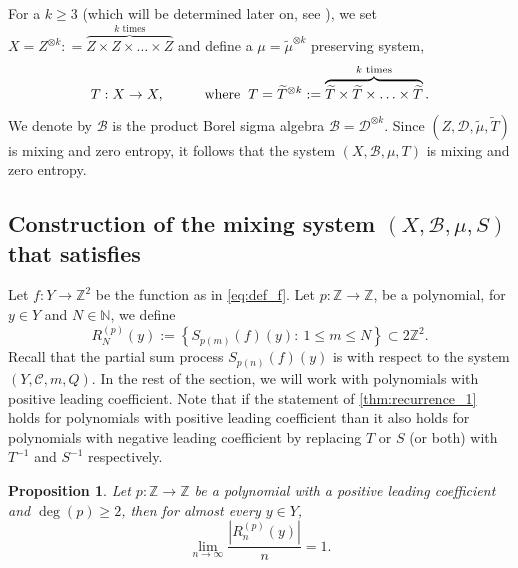 \documentclass[12pt,reqno]{amsart}
\newcommand{\N}{\mathbb{N}}
\newcommand{\Z}{\mathbb{Z}}
\newcommand{\B}{\mathcal{B}}
\newcommand{\TT}{\widetilde{T}}
\newcommand{\Tmu}{\widetilde{\mu}}
\newtheorem{prop}[thm]{Proposition}
\theoremstyle{definition}
\begin{document}
For a $k\geq3$ (which will be determined later on, see ), we set $X = Z^{\otimes k} : = \overbrace{Z \times Z \times\ldots \times Z}^\text{$k$ times}$ and define a  $\mu = \Tmu^{\otimes k}$ preserving system,
\[
T : X \rightarrow X, \hspace{10 mm} \mathrm{where} \hspace{2 mm} T = \TT^{\otimes k} : = \overbrace{\TT \times \TT \times\ldots \times \TT}^\text{$k$ times}.
\]
We denote by $\B$ is the product Borel sigma algebra $\B = \mathcal{D}^{\otimes k}$. Since $(Z,\mathcal{D},\Tmu,\TT)$ is  mixing and zero entropy, it follows that the system $(X,\B,\mu, T)$ is mixing and zero entropy.

\subsection{Construction of the mixing system $(X,\B,\mu, S)$ that satisfies }\label{sec:construction_S} Let $f:Y \to\Z^2$ be the function as in \eqref{eq:def_f}. Let $p:\Z\to\Z$, be a polynomial, for $y \in Y$ and $N\in\N$, we define\begin{equation}\label{eq:R_N_p_y}
R_N^{(p)}(y):=\left\{S_{p(m)}(f)(y):\ 1\leq m\leq N\right\} \subset 2\Z^2.
\end{equation}
Recall that the partial sum process $S_{p(n)}(f)(y)$ is with respect to the system $(Y,\mathcal{C},m,Q)$. 
In the rest of the section, we will work with polynomials with positive leading coefficient. Note that if the statement of \cref{thm:recurrence_1} holds for polynomials with positive leading coefficient than it also holds for polynomials with negative leading coefficient by replacing $T$ or $S$ (or both) with $T^{-1}$ and $S^{-1}$ respectively. 

\begin{prop}\label{prop:Range_of_cocycle_along_p} Let $p:\Z\to\Z$ be a polynomial with a positive leading coefficient and $\deg(p)\geq 2$, then for almost every $y \in Y$,
\[
\lim_{n\to\infty} \dfrac{\left|R_{n}^{(p)}(y)\right|}{n} = 1.
\]
\end{prop}
\end{document}
